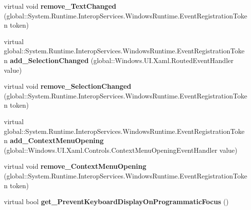 \begin{DoxyCompactItemize}
\item 
\mbox{\label{class_windows_1_1_u_i_1_1_xaml_1_1_controls_1_1_text_box_a35ae456324ad400806b770d7c47c57b4}} 
virtual void {\bfseries remove\+\_\+\+Text\+Changed} (global\+::\+System.\+Runtime.\+Interop\+Services.\+Windows\+Runtime.\+Event\+Registration\+Token token)
\item 
\mbox{\label{class_windows_1_1_u_i_1_1_xaml_1_1_controls_1_1_text_box_aa7a814e90af6bc70d3d39b87e1dcc130}} 
virtual global\+::\+System.\+Runtime.\+Interop\+Services.\+Windows\+Runtime.\+Event\+Registration\+Token {\bfseries add\+\_\+\+Selection\+Changed} (global\+::\+Windows.\+U\+I.\+Xaml.\+Routed\+Event\+Handler value)
\item 
\mbox{\label{class_windows_1_1_u_i_1_1_xaml_1_1_controls_1_1_text_box_ab695fdfc9633cf4e369d19dceb2d3327}} 
virtual void {\bfseries remove\+\_\+\+Selection\+Changed} (global\+::\+System.\+Runtime.\+Interop\+Services.\+Windows\+Runtime.\+Event\+Registration\+Token token)
\item 
\mbox{\label{class_windows_1_1_u_i_1_1_xaml_1_1_controls_1_1_text_box_ab836344ac1b9e4cb88bf838f48407e7c}} 
virtual global\+::\+System.\+Runtime.\+Interop\+Services.\+Windows\+Runtime.\+Event\+Registration\+Token {\bfseries add\+\_\+\+Context\+Menu\+Opening} (global\+::\+Windows.\+U\+I.\+Xaml.\+Controls.\+Context\+Menu\+Opening\+Event\+Handler value)
\item 
\mbox{\label{class_windows_1_1_u_i_1_1_xaml_1_1_controls_1_1_text_box_ad3a3c299db3a774e1db87983c4ee1b5c}} 
virtual void {\bfseries remove\+\_\+\+Context\+Menu\+Opening} (global\+::\+System.\+Runtime.\+Interop\+Services.\+Windows\+Runtime.\+Event\+Registration\+Token token)
\item 
\mbox{\label{class_windows_1_1_u_i_1_1_xaml_1_1_controls_1_1_text_box_ab8c87aab30bc9eb47b16617cd979f283}} 
virtual bool {\bfseries get\+\_\+\+Prevent\+Keyboard\+Display\+On\+Programmatic\+Focus} ()
\item 

\end{DoxyCompactItemize}
